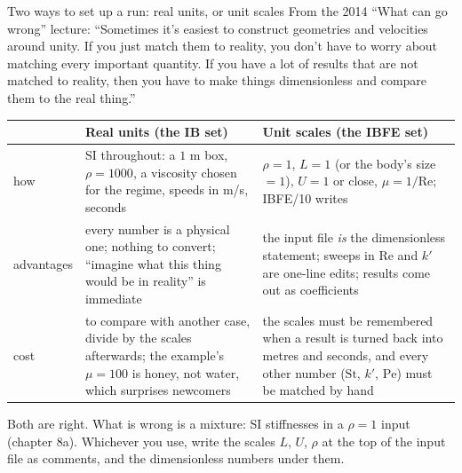 \documentclass[aspectratio=169,11pt]{beamer}
\begin{document}
\begin{frame}{Two ways to set up a run: real units, or unit scales}
\label{fr:twoways}
\small From the 2014 ``What can go wrong'' lecture: ``Sometimes it's easiest to construct geometries and velocities around unity. If you just match them to reality, you don't have to worry about matching every important quantity. If you have a lot of results that are not matched to reality, then you have to make things dimensionless and compare them to the real thing.''
\vspace{1mm}

\scriptsize
\begin{tabular}{@{}L{0.14\textwidth}L{0.38\textwidth}L{0.38\textwidth}@{}}
\toprule
 & Real units (the IB set) & Unit scales (the IBFE set)\\
\midrule
how & SI throughout: a $1$ m box, $\rho = 1000$, a viscosity chosen for the regime, speeds in m/s, seconds & $\rho = 1$, $L = 1$ (or the body's size $= 1$), $U = 1$ or close, $\mu = 1/\mathrm{Re}$; IBFE/10 writes \\
advantages & every number is a physical one; nothing to convert; ``imagine what this thing would be in reality'' is immediate & the input file \emph{is} the dimensionless statement; sweeps in $\mathrm{Re}$ and $k'$ are one-line edits; results come out as coefficients\\
cost & to compare with another case, divide by the scales afterwards; the example's $\mu = 100$ is honey, not water, which surprises newcomers & the scales must be remembered when a result is turned back into metres and seconds, and every other number ($\mathrm{St}$, $k'$, $\mathrm{Pe}$) must be matched by hand\\
\bottomrule
\end{tabular}

\vspace{2mm}
\small Both are right. What is wrong is a mixture: SI stiffnesses in a $\rho = 1$ input (chapter 8a). Whichever you use, write the scales $L$, $U$, $\rho$ at the top of the input file as comments, and the dimensionless numbers under them.
\end{frame}
\end{document}
